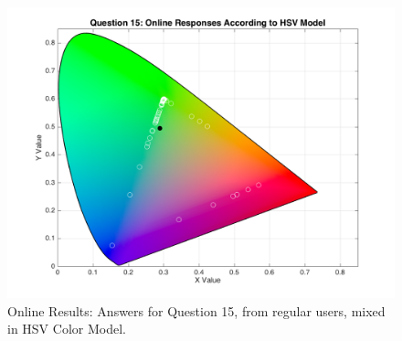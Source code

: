 \begin{figure}[htbp]
\begin{minipage}{0.48\textwidth}
    \includegraphics[width=\textwidth]{images/15_online_HSVresponses.png}
    \caption[Online Results: Answers for Question 15, from regular users, mixed in HSV Color Model.]{Online Results: Answers for Question 15, from regular users, mixed in HSV Color Model.}
    \label{fig:onlinehsvregular_15}
  \end{minipage}
\end{figure}
%
